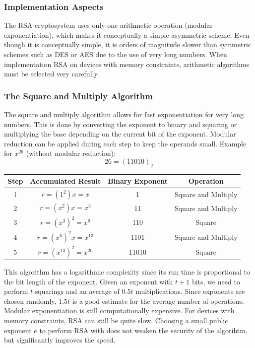 \documentclass{math}
\begin{document}
\subsubsection*{Implementation Aspects}
The RSA cryptosystem uses only one arithmetic operation (modular
exponentiation), which makes it conceptually a simple asymmetric scheme. Even
though it is conceptually simple, it is orders of magnitude slower than
symmetric schemes such as DES or AES due to the use of very long numbers.
When implementation RSA on devices with memory constraints, arithmetic
algorithms must be selected very carefully.

\subsubsection*{The Square and Multiply Algorithm}
The square and multiply algorithm allows for fast exponentiation for very long
numbers. This is done by converting the exponent to binary and squaring or
multiplying the base depending on the current bit of the exponent. Modular
reduction can be applied during each step to keep the operands small. Example
for \( x^{26} \) (without modular reduction):
\[ 26 = (11010)_2 \]
\begin{center}
  \begin{tabular}{|c|c|c|c|}
    \hline
    Step & Accumulated Result & Binary Exponent & Operation \\
    \hline
    1 & \( r = (1^2)x = x \) & 1 & Square and Multiply \\
    \hline
    2 & \( r = (x^2)x = x^3 \) & 11 & Square and Multiply \\
    \hline
    3 & \( r = (x^3)^2 = x^6 \) & 110 & Square \\
    \hline
    4 & \( r = (x^6)^2x = x^{13} \) & 1101 & Square and Multiply \\
    \hline
    5 & \( r = (x^{13})^2 = x^{26} \) & 11010 & Square \\
    \hline
  \end{tabular}
\end{center}
This algorithm has a logarithmic complexity since its run time is proportional
to the bit length of the exponent. Given an exponent with \( t+1 \) bits, we
need to perform \( t \) squarings and an average of \( 0.5t \) multiplications.
Since exponents are chosen randomly, \( 1.5t \) is a good estimate for the
average number of operations. Modular exponentiation is still computationally
expensive. For devices with memory constraints, RSA can still be quite slow.
Choosing a small public exponent \( e \) to perform RSA with does not weaken
the security of the algorihtm, but significantly improves the speed.
\end{document}
